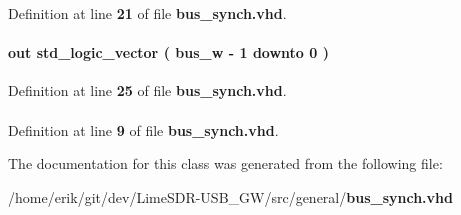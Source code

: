 Definition at line {\bf 21} of file {\bf bus\+\_\+synch.\+vhd}.

\paragraph[{signal\+\_\+sinch}]{ {\bfseries \textcolor{keywordflow}{out}\textcolor{vhdlchar}{ }} {\bfseries \textcolor{comment}{std\+\_\+logic\+\_\+vector}\textcolor{vhdlchar}{ }\textcolor{vhdlchar}{(}\textcolor{vhdlchar}{ }\textcolor{vhdlchar}{ }\textcolor{vhdlchar}{ }\textcolor{vhdlchar}{ }{\bfseries {\bf bus\+\_\+w}} \textcolor{vhdlchar}{-\/}\textcolor{vhdlchar}{ } \textcolor{vhdldigit}{1} \textcolor{vhdlchar}{ }\textcolor{keywordflow}{downto}\textcolor{vhdlchar}{ }\textcolor{vhdlchar}{ } \textcolor{vhdldigit}{0} \textcolor{vhdlchar}{ }\textcolor{vhdlchar}{)}\textcolor{vhdlchar}{ }} \hspace{0.3cm}{\ttfamily [Port]}}\label{classbus__synch_a1e3977995b78f3ad38e84ee0f9ada774}


Definition at line {\bf 25} of file {\bf bus\+\_\+synch.\+vhd}.

\paragraph[{std\+\_\+logic\+\_\+1164}]{\hspace{0.3cm}{\ttfamily [Package]}}\label{classbus__synch_acd03516902501cd1c7296a98e22c6fcb}


Definition at line {\bf 9} of file {\bf bus\+\_\+synch.\+vhd}.



The documentation for this class was generated from the following file\+:\begin{DoxyCompactItemize}
\item 
/home/erik/git/dev/\+Lime\+S\+D\+R-\/\+U\+S\+B\+\_\+\+G\+W/src/general/{\bf bus\+\_\+synch.\+vhd}\end{DoxyCompactItemize}
